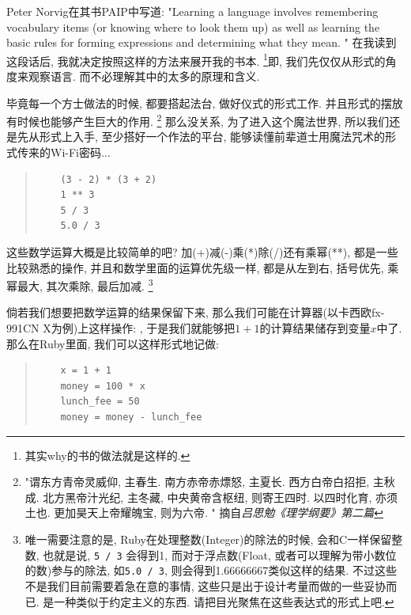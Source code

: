 
Peter Norvig在其书PAIP中写道: "Learning a language involves remembering vocabulary items (or knowing where to look them up) as well as learning the basic rules for forming expressions and determining what they mean. " 在我读到这段话后, 我就决定按照这样的方法来展开我的书本. \footnote{其实why的书的做法就是这样的. }即, 我们先仅仅从形式的角度来观察语言. 而不必理解其中的太多的原理和含义. 

毕竟每一个方士做法的时候, 都要搭起法台, 做好仪式的形式工作. 并且形式的摆放有时候也能够产生巨大的作用. \footnote{"谓东方青帝灵威仰, 主春生. 南方赤帝赤熛怒, 主夏长. 西方白帝白招拒, 主秋成. 北方黑帝汁光纪, 主冬藏, 中央黄帝含枢纽, 则寄王四时. 以四时化育, 亦须土也. 更加昊天上帝耀魄宝, 则为六帝. " 摘自\emph{吕思勉《理学纲要》第二篇}} 那么没关系, 为了进入这个魔法世界, 所以我们还是先从形式上入手, 至少搭好一个作法的平台, 能够读懂前辈道士用魔法咒术的形式传来的Wi-Fi密码... 

\begin{quotation}
  \begin{verbatim}
    (3 - 2) * (3 + 2)
    1 ** 3
    5 / 3
    5.0 / 3
  \end{verbatim}
\end{quotation}

这些数学运算大概是比较简单的吧? 加(+)减(-)乘(*)除(/)还有乘幂(**), 都是一些比较熟悉的操作, 并且和数学里面的运算优先级一样, 都是从左到右, 括号优先, 乘幂最大, 其次乘除, 最后加减. \footnote{唯一需要注意的是, Ruby在处理整数(Integer)的除法的时候, 会和C一样保留整数, 也就是说, \texttt{5 / 3} 会得到1, 而对于浮点数(Float, 或者可以理解为带小数位的数)参与的除法, 如\texttt{5.0 / 3}, 则会得到1.66666667类似这样的结果. 不过这些不是我们目前需要着急在意的事情, 这些只是出于设计考量而做的一些妥协而已. 是一种类似于约定主义的东西. 请把目光聚焦在这些表达式的形式上吧. }

倘若我们想要把数学运算的结果保留下来, 那么我们可能在计算器(以卡西欧fx-991CN X为例)上这样操作:  \fbox{+}   , 于是我们就能够把$1 + 1$的计算结果储存到变量$x$中了. 那么在Ruby里面, 我们可以这样形式地记做: 

\begin{quotation}
  \begin{verbatim}
    x = 1 + 1
    money = 100 * x
    lunch_fee = 50
    money = money - lunch_fee
  \end{verbatim}
\end{quotation}

